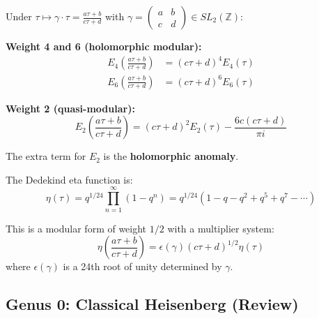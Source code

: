 \begin{proposition}\label{prop:eisenstein-modular}
Under $\tau \mapsto \gamma \cdot \tau = \frac{a\tau + b}{c\tau + d}$ with 
$\gamma = \begin{pmatrix} a & b \\ c & d \end{pmatrix} \in SL_2(\mathbb{Z})$:

\textbf{Weight 4 and 6 (holomorphic modular):}
\begin{align}
E_4\left(\frac{a\tau+b}{c\tau+d}\right) &= (c\tau + d)^4 E_4(\tau) \\
E_6\left(\frac{a\tau+b}{c\tau+d}\right) &= (c\tau + d)^6 E_6(\tau)
\end{align}

\textbf{Weight 2 (quasi-modular):}
\begin{equation}
E_2\left(\frac{a\tau+b}{c\tau+d}\right) = (c\tau + d)^2 E_2(\tau) 
- \frac{6c(c\tau + d)}{\pi i}
\end{equation}

The extra term for $E_2$ is the \textbf{holomorphic anomaly}.
\end{proposition}

\begin{definition}\label{def:eta-function}
The Dedekind eta function is:
\begin{equation}
\eta(\tau) = q^{1/24} \prod_{n=1}^{\infty} (1 - q^n) 
= q^{1/24}(1 - q - q^2 + q^5 + q^7 - \cdots)
\end{equation}

This is a modular form of weight $1/2$ with a multiplier system:
\begin{equation}
\eta\left(\frac{a\tau+b}{c\tau+d}\right) = \epsilon(\gamma) (c\tau + d)^{1/2} \eta(\tau)
\end{equation}
where $\epsilon(\gamma)$ is a 24th root of unity determined by $\gamma$.
\end{definition}

\subsection{Genus 0: Classical Heisenberg (Review)}
\label{subsec:heisenberg-genus-zero}

